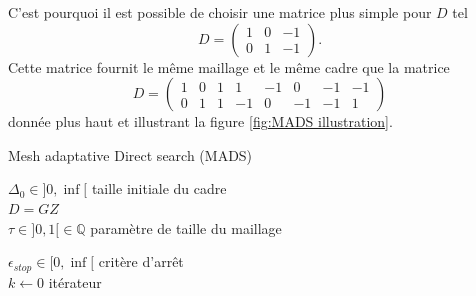 \documentclass[french]{report}
\begin{document}
C'est pourquoi il est possible de choisir une matrice plus simple pour $D$ tel
$$
    D=\begin{pmatrix}
        1 & 0 & -1 \\
        0 & 1 & -1
    \end{pmatrix}.
$$ Cette matrice fournit le même maillage et le même cadre que la matrice $$
    D=\begin{pmatrix}
        1 & 0 & 1 & 1  & -1 & 0  & -1 & -1 \\
        0 & 1 & 1 & -1 & 0  & -1 & -1 & 1
    \end{pmatrix}
$$ donnée plus haut et illustrant la figure \ref{fig:MADS illustration}.


\begin{algorithm}[htbp]

    \SetAlgoNoLine
    \caption{Mesh adaptative Direct search (MADS)}


    \Indp
    $\Delta_0 \in ] 0,\inf [$ \hspace{40pt} taille initiale du cadre \\
            $D=GZ$ \\
            $\tau \in ]0,1[ \in \mathbb{Q}$ \hspace{38pt} paramètre de taille du maillage

    $\epsilon_{stop} \in [ 0,\inf [$ \hspace{32pt} critère d'arrêt \\
    $k \leftarrow 0$ \hspace{65pt} itérateur \\
    \Indm


    \Indp
    \Indm
    \label{algo::MADS}
\end{algorithm}
\end{document}
